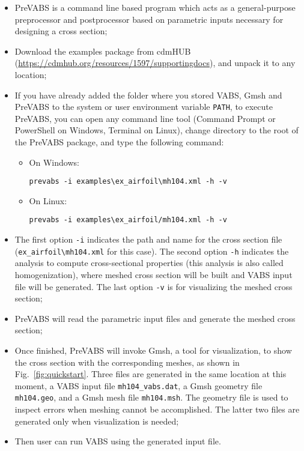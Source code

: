 \documentclass{book}
\begin{document}
\begin{itemize}
  \item PreVABS is a command line based program which acts as a 
    general-purpose preprocessor and postprocessor based on parametric 
    inputs necessary for designing a cross section;
  \item Download the examples package from cdmHUB 
    (\url{https://cdmhub.org/resources/1597/supportingdocs}), and unpack 
    it to any location;
  \item If you have already added the folder where you stored VABS, 
    Gmsh and PreVABS to the system or user environment variable 
    \lstinline|PATH|, to execute PreVABS, you can open any command line 
    tool (Command Prompt or PowerShell on Windows, Terminal on Linux), 
    change directory to the root of the PreVABS package, and type the 
    following command: 
  \begin{itemize}
    \item On Windows:
  
      \lstinline{prevabs -i examples\ex_airfoil\mh104.xml -h -v}
    
    \item On Linux:
  
      \lstinline{prevabs -i examples\ex_airfoil/mh104.xml -h -v}
  \end{itemize}
  \item The first option \lstinline|-i| indicates the path and name for 
    the cross section file (\lstinline|ex_airfoil\mh104.xml| for this 
    case). The second option \lstinline|-h| indicates the analysis to 
    compute cross-sectional properties (this analysis is also called 
    homogenization), where meshed cross section will be built and VABS 
    input file will be generated. The last option \lstinline|-v| is for 
    visualizing the meshed cross section;
  \item PreVABS will read the parametric input files and generate the 
    meshed cross section;
  \item Once finished, PreVABS will invoke Gmsh, a tool for visualization, 
    to show the cross section with the corresponding meshes, as shown 
    in Fig.~\ref{fig:quickstart}. Three files are generated in the same location at 
    this moment, a VABS input file \lstinline|mh104_vabs.dat|, a Gmsh 
    geometry file \lstinline|mh104.geo|, and a Gmsh mesh file 
    \lstinline|mh104.msh|. The geometry file is used to inspect errors 
    when meshing cannot be accomplished. The latter two files are 
    generated only when visualization is needed;
  \item Then user can run VABS using the generated input file.
\end{itemize}
\end{document}
